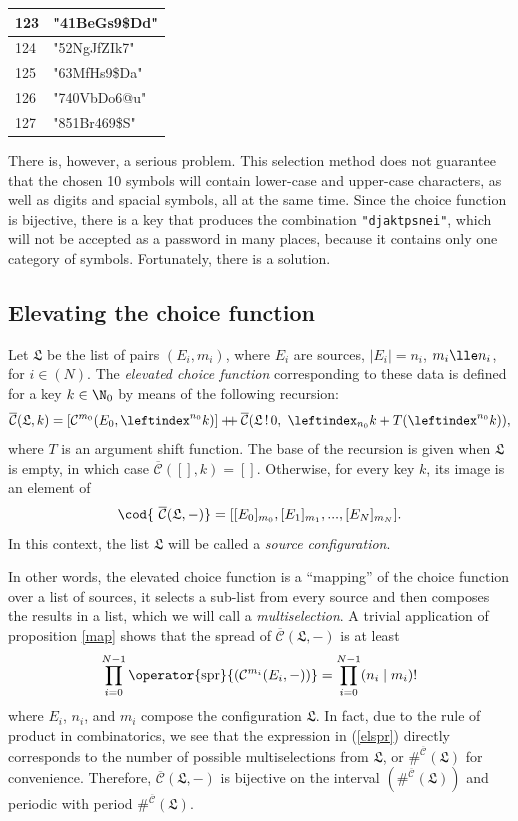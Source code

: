 \documentclass[12pt, a4paper]{article}
\newcommand{\C}{\mathcal{C}}
\newcommand{\CC}{\overline{\mathcal{C}}}
\newcommand{\conf}{\mathfrak{L}}
\newcommand{\dop}{\mathbin{{+}\hspace{-1mm}{+}}}
\newcommand{\spr}[1]{\operator{\mathrm{spr}}{\left(#1\right)}}
\newcommand{\lli}[1]{\leftindex_{#1}}
\newcommand{\lui}[1]{\leftindex^{#1}}
\newcommand{\wo}{\mathop{!}}
\begin{document}
\begin{center}
\def\arraystretch{1.3}
\begin{tabular}{l|l}
    123 & \ttfamily"41BeGs9\$Dd"\\
    \hline
    124 & \ttfamily"52NgJfZIk7"\\
    \hline
    125 & \ttfamily"63MfHs9\$Da"\\
    \hline
    126 & \ttfamily"740VbDo6@u"\\
    \hline
    127 & \ttfamily"851Br469\$S"\\
\end{tabular}
\end{center}

There is, however, a serious problem. This selection method does not guarantee that the chosen 10 symbols will contain lower-case and upper-case characters, as well as digits and spacial symbols, all at the same time. Since the choice function is bijective, there is a key that produces the combination \texttt{"djaktpsnei"}, which will not be accepted as a password in many places, because it contains only one category of symbols. Fortunately, there is a solution.

\subsection{Elevating the choice function}

\begin{definition}
    Let $ \conf $ be the list of pairs $ (E_i, m_i) $, where $ E_i $ are sources, $ |E_i| = n_i $, $ m_i \lle n_i $, for $ i \in (N) $. The \emph{elevated choice function} corresponding to these data is defined for a key $ k \in \N_0 $ by means of the following recursion:
    \[ \CC(\conf, k) = [\C^{m_0}(E_0, \lui{n_0}k)] \dop \CC(\conf \wo 0,\ \lli{n_0}k + T(\lui{n_0}k)), \]
    where $ T $ is an argument shift function. The base of the recursion is given when $ \conf $ is empty, in which case $ \CC([], k) = [] $. Otherwise, for every key $ k $, its image is an element of
    \[ \cod{\ \CC(\conf, -)} = [[E_0]_{m_0}, [E_1]_{m_1}, ..., [E_N]_{m_N}]. \]
    In this context, the list $ \conf $ will be called a \emph{source configuration}.
\end{definition}

In other words, the elevated choice function is a ``mapping'' of the choice function over a list of sources, it selects a sub-list from every source and then composes the results in a list, which we will call a \emph{multiselection}. A trivial application of proposition \ref{map} shows that the spread of $ \CC(\conf, -) $ is at least
\begin{equation}\label{elspr}
    \prod\limits_{i = 0}^{N-1} \spr{\C^{m_i}(E_i, -)} = \prod\limits_{i = 0}^{N-1} (n_i \mid m_i)!
\end{equation}
where $ E_i $, $ n_i $, and $ m_i $ compose the configuration $ \conf $. In fact, due to the rule of product in combinatorics, we see that the expression in (\ref{elspr}) directly corresponds to the number of possible multiselections from $ \conf $, or $ \#^{\CC}(\conf) $ for convenience. Therefore, $ \CC(\conf, -) $ is bijective on the interval $ \left(\#^{\CC}(\conf)\right) $ and periodic with period $ \#^{\CC}(\conf) $.
\end{document}
